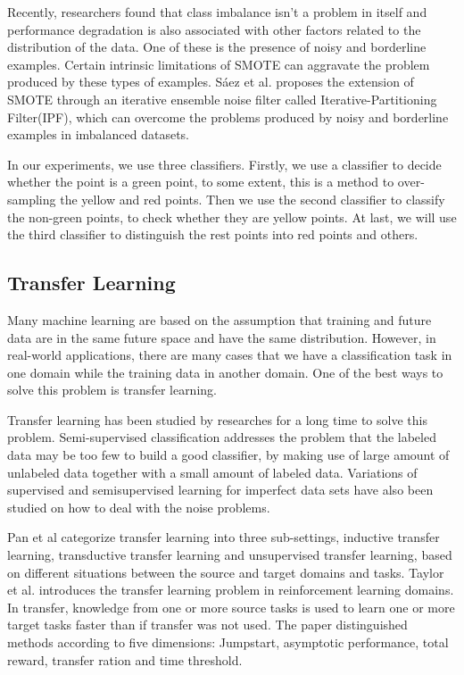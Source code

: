 Recently, researchers found that class imbalance isn't a problem in itself and performance degradation is also associated with other factors related to the distribution of the data. One of these is the presence of noisy and borderline examples. Certain intrinsic limitations of SMOTE can aggravate the problem produced by these types of examples. 
S\'{a}ez et al.\cite{S2015SMOTE} proposes the extension of 
SMOTE through an iterative ensemble noise filter called Iterative-Partitioning Filter(IPF), which can overcome the problems produced by noisy and borderline examples in imbalanced datasets.

In our experiments, we use three classifiers. Firstly, we use a classifier to decide whether the point is a green point, to some extent, this is a method to over-sampling the yellow and red points. Then we use the second classifier to classify the non-green points, to check whether they are yellow points. At last, we will use the third classifier to distinguish the rest points into red points and others.     
	

\subsection{Transfer Learning}
Many machine learning are based on the assumption that training and future data are in the same future space and have the same distribution. However, in real-world applications, there are many cases that we have a classification task in one domain while the training data in another domain. One of the best ways to solve this problem is transfer learning.


Transfer learning has been studied by researches for a long time to solve this problem. Semi-supervised classification \cite{14,15,16,17}addresses the problem that the labeled data may be too few to build a good classifier, by making use of large amount of unlabeled data together with a small amount of labeled data. Variations of supervised and semisupervised learning for imperfect data sets have also been studied on how to deal with the noise problems.

Pan et al \cite{Pan:Survey} categorize transfer learning into 
three sub-settings, inductive transfer learning, transductive transfer 
learning and unsupervised transfer learning, based on different 
situations between the source and target domains and tasks. 
Taylor et al. \cite{Taylor:Survey} introduces the transfer learning 
problem in reinforcement learning domains. In transfer, 
knowledge from one or more source tasks is used to learn one or 
more target tasks faster than if transfer was not used. 
The paper distinguished methods according to five dimensions: 
Jumpstart, asymptotic performance, total reward, transfer 
ration and time threshold.


